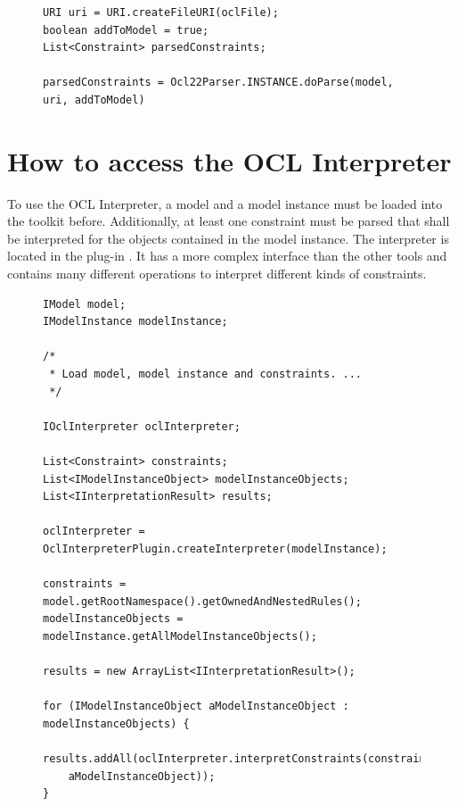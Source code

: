 \begin{figure}[!b]
\begin{lstlisting}[caption={How to parse constraints.}, captionpos=b, label=lst:integration:parserConstraints]
URI uri = URI.createFileURI(oclFile);
boolean addToModel = true;
List<Constraint> parsedConstraints;

parsedConstraints = Ocl22Parser.INSTANCE.doParse(model, uri, addToModel)
\end{lstlisting}
\end{figure}



\section{How to access the OCL Interpreter}

To use the \acs{OCL} Interpreter, a model and a model instance must be loaded 
into the toolkit before. Additionally, at least one constraint must be parsed 
that shall be interpreted for the objects contained in the model instance. The 
interpreter is located in the plug-in 
. It has a more 
complex interface than the other tools and contains many different operations 
to interpret different kinds of constraints.

\begin{figure}[!b]
\begin{lstlisting}[caption={How to interpret constraints.}, captionpos=b, label=lst:integration:interpretConstraints]
IModel model;
IModelInstance modelInstance;

/*
 * Load model, model instance and constraints. ...
 */

IOclInterpreter oclInterpreter;

List<Constraint> constraints;
List<IModelInstanceObject> modelInstanceObjects;
List<IInterpretationResult> results;

oclInterpreter = OclInterpreterPlugin.createInterpreter(modelInstance);

constraints = model.getRootNamespace().getOwnedAndNestedRules();
modelInstanceObjects = modelInstance.getAllModelInstanceObjects();

results = new ArrayList<IInterpretationResult>();

for (IModelInstanceObject aModelInstanceObject : modelInstanceObjects) {
  results.addAll(oclInterpreter.interpretConstraints(constraints,
  	aModelInstanceObject));
}
\end{lstlisting}
\end{figure}


